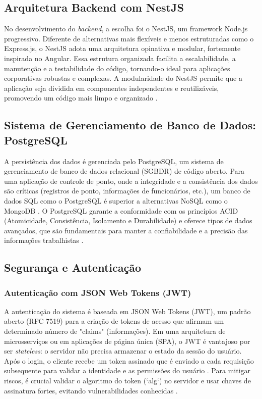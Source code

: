 \subsection{Arquitetura Backend com NestJS}
\par No desenvolvimento do \textit{backend}, a escolha foi o NestJS, um framework Node.js progressivo. Diferente de alternativas mais flexíveis e menos estruturadas como o Express.js, o NestJS adota uma arquitetura opinativa e modular, fortemente inspirada no Angular. Essa estrutura organizada facilita a escalabilidade, a manutenção e a testabilidade do código, tornando-o ideal para aplicações corporativas robustas e complexas. A modularidade do NestJS permite que a aplicação seja dividida em componentes independentes e reutilizáveis, promovendo um código mais limpo e organizado \cite{NestJSModular}.

\subsection{Sistema de Gerenciamento de Banco de Dados: PostgreSQL}
\par A persistência dos dados é gerenciada pelo PostgreSQL, um sistema de gerenciamento de banco de dados relacional (SGBDR) de código aberto. Para uma aplicação de controle de ponto, onde a integridade e a consistência dos dados são críticas (registros de ponto, informações de funcionários, etc.), um banco de dados SQL como o PostgreSQL é superior a alternativas NoSQL como o MongoDB \cite{PostgreSQLvsMongoDB_AWS}. O PostgreSQL garante a conformidade com os princípios ACID (Atomicidade, Consistência, Isolamento e Durabilidade) e oferece tipos de dados avançados, que são fundamentais para manter a confiabilidade e a precisão das informações trabalhistas \cite{PostgreSQLACID}.

\subsection{Segurança e Autenticação}

\subsubsection{Autenticação com JSON Web Tokens (JWT)}
\par A autenticação do sistema é baseada em JSON Web Tokens (JWT), um padrão aberto (RFC 7519) para a criação de tokens de acesso que afirmam um determinado número de "claims" (informações). Em uma arquitetura de microsserviços ou em aplicações de página única (SPA), o JWT é vantajoso por ser \textit{stateless}: o servidor não precisa armazenar o estado da sessão do usuário. Após o login, o cliente recebe um token assinado que é enviado a cada requisição subsequente para validar a identidade e as permissões do usuário \cite{JWTvsCookies}. Para mitigar riscos, é crucial validar o algoritmo do token (`alg`) no servidor e usar chaves de assinatura fortes, evitando vulnerabilidades conhecidas \cite{JWTVulnerabilities}.

